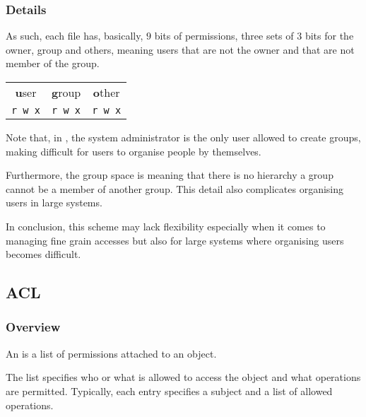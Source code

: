 \begin{frame}[containsverbatim]
  \frametitle{Details}

  As such, each file has, basically, $9$ bits of permissions, three sets of
  $3$ bits  for the owner, group and others, meaning users that are
  not the owner and that are not member of the group.

  \begin{center}
    \begin{tabular}{ccc}
      \textbf{u}ser & \textbf{g}roup & \textbf{o}ther \\
      \verb|r w x| & \verb|r w x| & \verb|r w x| \\
    \end{tabular}
  \end{center}

  Note that, in , the system administrator is the only user allowed
  to create groups, making difficult for users to organise people by
  themselves.

  \-

  Furthermore, the group space is  meaning that there is no
  hierarchy \ie{} a group cannot be a member of another group. This detail
  also complicates organising users in large systems.

  \-

  In conclusion, this scheme may lack flexibility especially when it comes to
  managing fine grain accesses but also for large systems where organising
  users becomes difficult.
\end{frame}


\subsection{ACL}


\begin{frame}
  \frametitle{Overview}

  An  is a list of permissions
  attached to an object.

  \-

  The list specifies who or what is allowed to access the object and what
  operations are permitted. Typically, each  entry specifies a
  subject and a list of allowed operations.
\end{frame}


